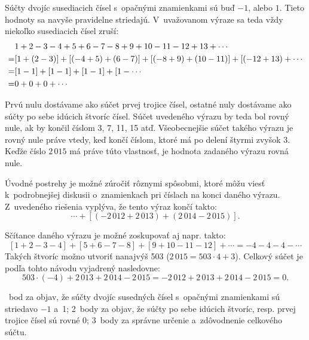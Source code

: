 {%
Súčty dvojíc susediacich čísel s~opačnými znamienkami sú buď $-1$, alebo $1$.
Tieto hodnoty sa navyše pravidelne striedajú.
V~uvažovanom výraze sa teda vždy niekoľko susediacich čísel zruší:
$$
\aligned
&1+2-3-4+5+6-7-8+9+10-11-12+13+\cdots\\
=&[1+(2-3)]+[(-4+5)+(6-7)]+[(-8+9)+(10-11)]+[(-12+13)+\cdots\\
=&[1-1]+[1-1]+[1-1]+[1-\cdots\\
=&0+0+0+\cdots
\endaligned
$$

Prvú nulu dostávame ako súčet prvej trojice čísel, ostatné nuly dostávame
ako súčty po sebe idúcich štvoríc čísel.
Súčet uvedeného výrazu by teda bol rovný nule, ak by končil číslom 3, 7,
11, 15 atď.
Všeobecnejšie súčet takého výrazu je rovný nule práve vtedy, keď končí
číslom, ktoré má po delení štyrmi zvyšok 3.
Keďže číslo $2\,015$ má práve túto vlastnosť, je hodnota zadaného výrazu
rovná nule.

\poznamka
Úvodné postrehy je možné zúročiť rôznymi spôsobmi, ktoré môžu viesť k~podrobnejšej diskusii o~znamienkach pri číslach na konci daného výrazu.
Z~uvedeného riešenia vyplýva, že tento výraz končí takto:
$$
\cdots+[(-2\,012+2\,013)+(2\,014-2\,015)].
$$

Sčítance daného výrazu je možné zoskupovať aj napr. takto:
$$
[1+2-3-4]+[5+6-7-8]+[9+10-11-12]+\cdots
=-4-4-4-\cdots
$$
Takých štvoríc možno utvoriť nanajvýš 503 ($2\,015=503\cdot 4+3$).
Celkový súčet je podľa tohto návodu vyjadrený nasledovne:
$$
503\cdot(-4)+2\,013+2\,014-2\,015
=-2\,012+2\,013+2\,014-2\,015 =0.
$$

~bod za objav, že súčty dvojíc susedných čísel s~opačnými znamienkami sú
striedavo $-1$ a~1;
2~body za objav, že súčty po sebe idúcich štvoríc, resp. prvej trojice
čísel sú rovné 0;
3~body za správne určenie a~zdôvodnenie celkového súčtu.
\endhodnotenie}

